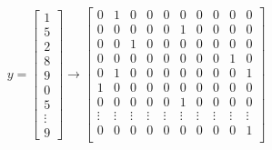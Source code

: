 \documentclass[12pt]{article}
\begin{document}
\begin{equation}
y=\begin{bmatrix}
1\\5\\2\\8\\9\\0\\5\\ \vdots \\9
\end{bmatrix} \rightarrow \begin{bmatrix}
0 & 1 & 0 & 0 & 0 & 0 & 0 & 0 & 0 & 0\\
0 & 0 & 0 & 0 & 0 & 1 & 0 & 0 & 0 & 0\\
0 & 0 & 1 & 0 & 0 & 0 & 0 & 0 & 0 & 0\\
0 & 0 & 0 & 0 & 0 & 0 & 0 & 0 & 1 & 0\\
0 & 1 & 0 & 0 & 0 & 0 & 0 & 0 & 0 & 1\\
1 & 0 & 0 & 0 & 0 & 0 & 0 & 0 & 0 & 0\\
0 & 0 & 0 & 0 & 0 & 1 & 0 & 0 & 0 & 0\\
\vdots & \vdots & \vdots & \vdots & \vdots & \vdots & \vdots & \vdots & \vdots & \vdots \\
0 & 0 & 0 & 0 & 0 & 0 & 0 & 0 & 0 & 1\\
\end{bmatrix}
\end{equation}
\end{document}
